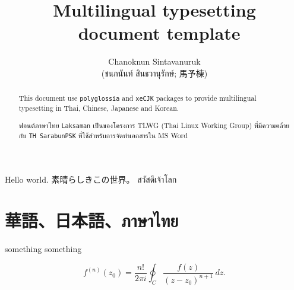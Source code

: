 \documentclass{article}
\title{Multilingual typesetting \XeTeX ~document template}
\author{Chanoknun Sintavanuruk \\ (\textthai{ชนกนันท์ สินธวานุรักษ์}; 馬予棟)}
\begin{document}
	\maketitle
	Hello world. 素晴らしきこの世界。 \textthai{สวัสดีเจ้าโลก}
	
	\begin{abstract}
		This document use \texttt{polyglossia} and \texttt{xeCJK} packages to provide multilingual typesetting in Thai, Chinese, Japanese and Korean. 
		\begin{thai}
			ฟอนต์ภาษาไทย \textenglish{\texttt{Laksaman}} เป็นของโครงการ \textenglish{TLWG (Thai Linux Working Group)} 
			ที่มีความคล้ายกับ \textenglish{\texttt{TH SarabunPSK}} ที่ใช้สำหรับการจัดทำเอกสารใน MS Word	
		\end{thai}
	\end{abstract}
	
	\section{華語、日本語、\textthai{ภาษาไทย}}

	something something

	\begin{equation}
		f^{(n)}(z_0)=\frac{n!}{2\pi i}\oint_C \frac{f(z)}{(z-z_0)^{n+1}}\,dz.
	\end{equation}
	
\end{document}
